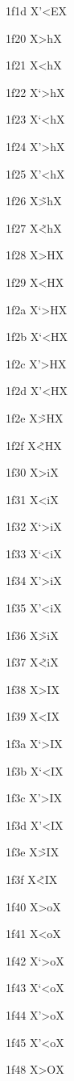 \documentclass[11pt]{article}
\begin{document}
1f1d X{\textgreek{'<E}}X

1f20 X{\textgreek{>h}}X

1f21 X{\textgreek{<h}}X

1f22 X{\textgreek{`>h}}X

1f23 X{\textgreek{`<h}}X

1f24 X{\textgreek{'>h}}X

1f25 X{\textgreek{'<h}}X

1f26 X{\textgreek{\~{>h}}}X

1f27 X{\textgreek{\~{<h}}}X

1f28 X{\textgreek{>H}}X

1f29 X{\textgreek{<H}}X

1f2a X{\textgreek{`>H}}X

1f2b X{\textgreek{`<H}}X

1f2c X{\textgreek{'>H}}X

1f2d X{\textgreek{'<H}}X

1f2e X{\textgreek{\~{>H}}}X

1f2f X{\textgreek{\~{<H}}}X

1f30 X{\textgreek{>i}}X

1f31 X{\textgreek{<i}}X

1f32 X{\textgreek{`>i}}X

1f33 X{\textgreek{`<i}}X

1f34 X{\textgreek{'>i}}X

1f35 X{\textgreek{'<i}}X

1f36 X{\textgreek{\~{>i}}}X

1f37 X{\textgreek{\~{<i}}}X

1f38 X{\textgreek{>I}}X

1f39 X{\textgreek{<I}}X

1f3a X{\textgreek{`>I}}X

1f3b X{\textgreek{`<I}}X

1f3c X{\textgreek{'>I}}X

1f3d X{\textgreek{'<I}}X

1f3e X{\textgreek{\~{>I}}}X

1f3f X{\textgreek{\~{<I}}}X

1f40 X{\textgreek{>o}}X

1f41 X{\textgreek{<o}}X

1f42 X{\textgreek{`>o}}X

1f43 X{\textgreek{`<o}}X

1f44 X{\textgreek{'>o}}X

1f45 X{\textgreek{'<o}}X

1f48 X{\textgreek{>O}}X
\end{document}
